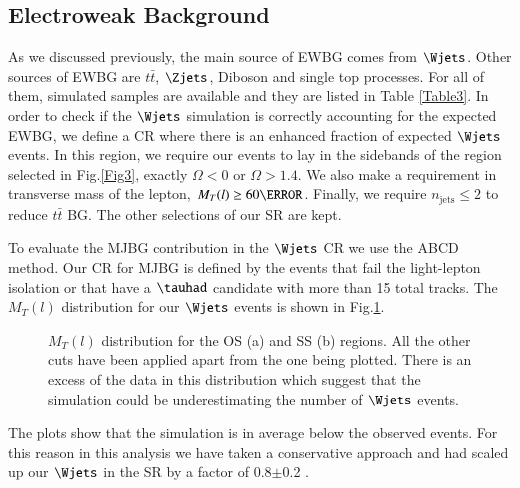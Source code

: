 \subsection{Electroweak Background}
As we discussed previously, the main source of EWBG comes from $\Wjets$. Other sources of EWBG are $t\bar{t}$, $\Zjets$, Diboson and single top processes. For all of them, simulated samples are available and they are listed in Table \ref{Table3}. In order to check if the $\Wjets$  simulation is correctly accounting for the expected EWBG, we define a CR where there is an enhanced fraction of expected $\Wjets$ events. In this region, we require our events to lay in the sidebands of the region selected in Fig.\ref{Fig3}, exactly $\Omega<0$ or $\Omega>1.4$. We also make a requirement in transverse mass of the lepton, $M_T(l)\ge 60 \GeV$. Finally, we require $n_{\text{jets}}\le 2$ to reduce $t\bar{t}$ BG. The other selections of our SR are kept.

To evaluate the MJBG contribution in the $\Wjets$ CR we use the ABCD method. Our CR for MJBG is defined by the events that fail the light-lepton isolation or that have a $\tauhad$ candidate with more than 15 total tracks. The  $M_T(l)$ distribution for our $\Wjets$ events is shown in Fig.\ref{Fig8}. 
\begin{figure}[htbp]
	\centering
	\hfill
	\caption{$M_T(l)$ distribution for the OS (a) and SS (b) regions. All the other cuts have been applied apart from the one being plotted. There is an excess of the data in this distribution which suggest that the simulation could be underestimating the number of $\Wjets$ events.}
	\label{Fig8}
\end{figure} 
The plots show that the simulation is in average below the observed events. For this reason in this analysis we have taken a conservative approach and had scaled up our $\Wjets$ in the SR by a factor of 0.8$\pm$0.2 .